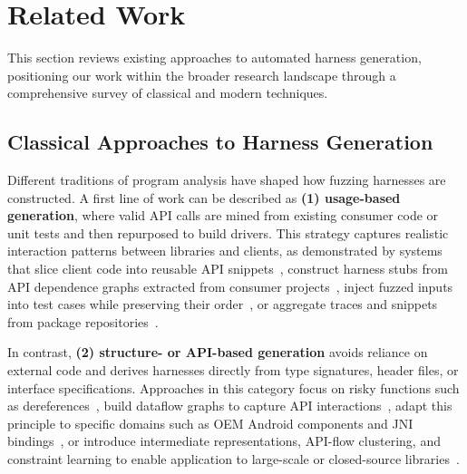 \section{Related Work}
\label{sec:related-work}

This section reviews existing approaches to automated harness generation, positioning our work within the broader research landscape through a comprehensive survey of classical and modern techniques.

\subsection{Classical Approaches to Harness Generation}
\label{subsec:classical-harness-generation}



Different traditions of program analysis have shaped how fuzzing harnesses are constructed. A first line of work can be described as \textbf{(1) usage-based generation}, where valid API calls are mined from existing consumer code or unit tests and then repurposed to build drivers. This strategy captures realistic interaction patterns between libraries and clients, as demonstrated by systems that slice client code into reusable API snippets~\cite{DBLP:conf/sigsoft/BabicBCIKKLSW19:FUDGE}, construct harness stubs from API dependence graphs extracted from consumer projects~\cite{DBLP:conf/uss/IspoglouAMP20:FuzzGen}, inject fuzzed inputs into test cases while preserving their order~\cite{DBLP:conf/sp/JeongJYMKJKSH23:UTopia}, or aggregate traces and snippets from package repositories~\cite{DBLP:journals/pacmse/WuNH25:WildSync, DBLP:conf/icse/ZhangZLWLZJ23:Daisy}.

In contrast, \textbf{(2) structure- or API-based generation} avoids reliance on external code and derives harnesses directly from type signatures, header files, or interface specifications. Approaches in this category focus on risky functions such as dereferences~\cite{DBLP:conf/icse:ZhangLMZ021:IntelliGen}, build dataflow graphs to capture API interactions~\cite{DBLP:conf/icse/GreenA22:GraphFuzz}, adapt this principle to specific domains such as OEM Android components and JNI bindings~\cite{DBLP:conf/ccs/ChenXLWC23:Hopper, DBLP:conf/uss/IspoglouAMP20:FuzzGen, DBLP:conf/issta/XiongDCQWSZ24:Atlas}, or introduce intermediate representations, API-flow clustering, and constraint learning to enable application to large-scale or closed-source libraries~\cite{DBLP:journals/pacmse/ToffaliniBTP25:LibErator, DBLP:conf/icse/ShermanN25:OGHarn, DBLP:conf/ndss/0007ZLSZLQ25:NEXZZER}.

